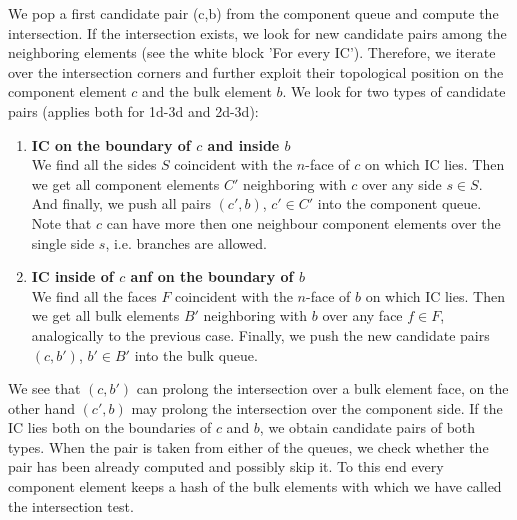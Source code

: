 \documentclass{elsarticle}
\newcommand{\noteJB}[1]{{\color{Blue} \textbf{JB: } \textit{#1}}}
\newcommand{\nface}{$n$-face }
\begin{document}
We pop a first candidate pair (c,b) from the component queue and compute the intersection.
If the intersection exists, we look for new candidate pairs among the neighboring elements
(see the white block 'For every IC').
Therefore, we iterate over the intersection corners and further exploit their topological position on the component element $c$ and the bulk element $b$.
We look for two types of candidate pairs (applies both for 1d-3d and 2d-3d):
\begin{enumerate}[label=(\alph*)]
    \item \textbf{IC on the boundary of $c$  and inside $b$} \\
            We find all the sides $S$ coincident with the \nface of $c$ on which IC lies. Then we get all component
            elements $C'$ neighboring with $c$ over any side $s\in S$. And finally, we push all pairs $(c',b)$, $c'\in C'$ 
            into the component queue.
            Note that $c$ can have more then one neighbour component elements over the single side $s$, i.e. branches are allowed.
    \item \textbf{IC inside of $c$ anf on the boundary of $b$} \label{enum:prolong2}\\
            We find all the faces $F$ coincident with the \nface of $b$ on which IC lies. 
            Then we get all bulk elements $B'$ neighboring with $b$ over any face $f\in F$,
            analogically to the previous case.
            Finally, we push the new candidate pairs $(c, b')$, $b'\in B'$ into the bulk queue.
\end{enumerate}
We see that $(c, b')$ can prolong the intersection over a bulk element face, on the other hand $(c', b)$ may prolong the intersection over the component side. If the IC lies both on the boundaries of $c$ and $b$,
we obtain candidate pairs of both types.
When the pair is taken from either of the queues, we check whether the pair has been already computed and possibly skip it. 
To this end every component element keeps a hash of the bulk elements with which we have called the intersection test.
\end{document}

